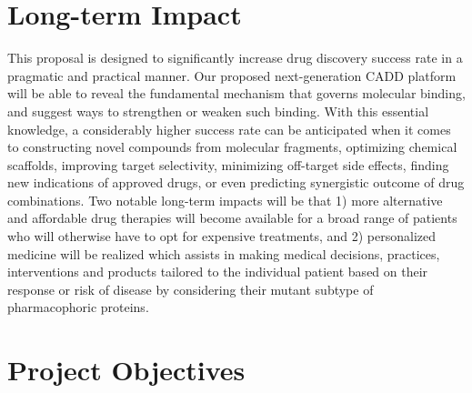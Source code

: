 \documentclass[a4paper,12pt]{article}
\begin{document}
\section*{Long-term Impact}

This proposal is designed to significantly increase drug discovery success rate in a pragmatic and practical manner. Our proposed next-generation CADD platform will be able to reveal the fundamental mechanism that governs molecular binding, and suggest ways to strengthen or weaken such binding. With this essential knowledge, a considerably higher success rate can be anticipated when it comes to constructing novel compounds from molecular fragments, optimizing chemical scaffolds, improving target selectivity, minimizing off-target side effects, finding new indications of approved drugs, or even predicting synergistic outcome of drug combinations. Two notable long-term impacts will be that 1) more alternative and affordable drug therapies will become available for a broad range of patients who will otherwise have to opt for expensive treatments, and 2) personalized medicine will be realized which assists in making medical decisions, practices, interventions and products tailored to the individual patient based on their response or risk of disease by considering their mutant subtype of pharmacophoric proteins.

\section*{Project Objectives}
\end{document}
